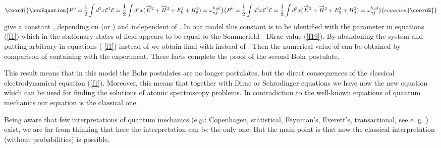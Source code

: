 \documentclass[a4paper,12pt]{article}
\begin{document}
\begin{equation}\coord{}\boxEquation{
P^0=\frac 12\int d^3x\mathcal{E}^{\dagger }\mathcal{E}=\frac 12\int d^3x(
\overrightarrow{E}^2+\overrightarrow{H}^2+E_0^2+H_0^2)=\omega _{nj}^{hyd}
\label{f25}
}{
P^0=\frac 12\int d^3x\mathcal{E}^{\dagger }\mathcal{E}=\frac 12\int d^3x(
\overrightarrow{E}^2+\overrightarrow{H}^2+E_0^2+H_0^2)=\omega _{nj}^{hyd}
}{ecuacion}\coordE{}\end{equation}
give a constant \coordHE{}, depending on \coordHE{} (or \coordHE{}) and
independent of \coordHE{}. In our model this constant is to be identified with the
parameter \myHighlight{$\omega $}\coordHE{} in equations (\ref{f1}) which in the stationary states
of \coordHE{} field appears to be
equal to the Sommerfeld - Dirac value \coordHE{} (\ref{f19}). By
abandoning the \coordHE{} system and putting arbitrary \coordHE{} in equations (%
\ref{f1}) instead of \myHighlight{$\hbar $}\coordHE{} we obtain final \coordHE{} with \coordHE{}
instead of \myHighlight{$\hbar $}\coordHE{}. Then the numerical value of \myHighlight{$\hbar $}\coordHE{}can be obtained by
comparison of \coordHE{} containing \coordHE{} with the experiment.
These facts complete the proof of the second Bohr postulate.

This result means that in this model the Bohr postulates are no longer
postulates, but the direct consequences of the classical electrodynamical
equation (\ref{f1}). Moreover, this means that together with Dirac or
Schrodinger equations we have now the new equation which can be used for
finding the solutions of atomic spectroscopy problems. In contradiction to
the well-known equations of quantum mechanics our equation is the classical
one.

Being aware that few interpretations of quantum mechanics (e.g.: Copenhagen,
statistical, Feynman's, Everett's, transactional, see e. g. \cite{JC})
exist, we are far from thinking that here the interpretation can be the only
one. But the main point is that now the classical interpretation (without
probabilities) is possible.
\end{document}
